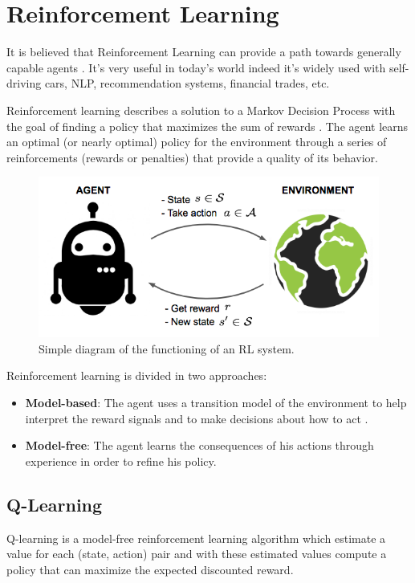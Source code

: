 \section{Reinforcement Learning}
It is believed that Reinforcement Learning can provide a path towards generally capable agents \cite{silver2021reward} \cite{parker2022automated}.
It's very useful in today's world indeed it's widely used with self-driving cars, NLP, recommendation systems, financial trades, etc.

Reinforcement learning \cite{sutton2018reinforcement} describes a solution to a Markov Decision Process 
with the goal of finding a policy that maximizes the sum of rewards \cite{huys2014reward}.
%
The agent learns an optimal (or nearly optimal) policy for the environment \cite{russell2002artificial}
through a series of reinforcements (rewards or penalties) that provide a quality of its behavior.

\begin{figure}[ht]
    \centering
    \includegraphics[scale=0.4]{images/RL_illustration.png}
    \caption{Simple diagram of the functioning of an RL system.}
    \label{fig:RL_illustration}
\end{figure}

\newpage
\noindent
Reinforcement learning is divided in two approaches:
\begin{itemize}
    \item \textbf{Model-based}:
          The agent uses a transition model of the environment to help interpret the reward signals and to make decisions about how to act \cite{russell2021artificial}.
    \item \textbf{Model-free}:
          The agent learns the consequences of his actions through experience in order to refine his policy.
\end{itemize}


\subsection{Q-Learning}
Q-learning \cite{watkins1992q} is a model-free reinforcement learning algorithm which estimate a value for each (state, action) pair
and with these estimated values compute a policy that can maximize the expected discounted reward.

